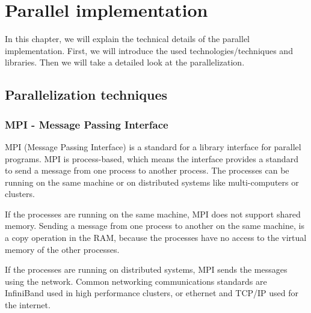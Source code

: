 \chapter{Parallel implementation}
In this chapter, we will explain the technical details of the parallel implementation.
First, we will introduce the used technologies/techniques and libraries.
Then we will take a detailed look at the parallelization.


\section{Parallelization techniques}
\subsection{MPI - Message Passing Interface}
MPI (Message Passing Interface) is a standard for a library interface for parallel programs.
MPI is process-based, which means the interface provides a standard to send a message from one process to another process.
The processes can be running on the same machine or on distributed systems like multi-computers or clusters.

If the processes are running on the same machine, MPI does not support shared memory. 
Sending a message from one process to another on the same machine, is a copy operation in the RAM, because the processes have no access to the virtual memory of the other processes.

If the processes are running on distributed systems, MPI sends the messages using the network.
Common networking communications standards are InfiniBand used in high performance clusters, or ethernet and TCP/IP used for the internet.

